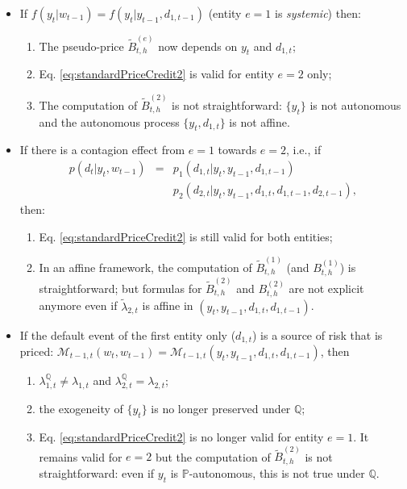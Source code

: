\documentclass[
  12pt,
]{book}
\providecommand{\tightlist}{%
  \setlength{\itemsep}{0pt}\setlength{\parskip}{0pt}}
\theoremstyle{definition}
\theoremstyle{definition}
\theoremstyle{definition}
\theoremstyle{definition}
\theoremstyle{remark}
\begin{document}
\begin{itemize}
\item
  If \(f (y_t | w_{t-1}) = f (y_t | y_{t-1} , d_{1, t-1})\) (entity \(e = 1\) is \emph{systemic}) then:

  \begin{enumerate}
  \def\labelenumi{\alph{enumi}.}
  \tightlist
  \item
    The pseudo-price \(\widetilde{B}^{(e)}_{t,h}\) now depends on \(y_t\) and \(d_{1, t}\);
  \item
    Eq. \eqref{eq:standardPriceCredit2} is valid for entity \(e = 2\) only;
  \item
    The computation of \(\widetilde{B}^{(2)}_{t,h}\) is not straightforward: \(\{ y_t \}\)
    is not autonomous and the autonomous process \(\{ y_t, d_{1,t} \}\) is not affine.
  \end{enumerate}
\item
  If there is a contagion effect from \(e = 1\) towards \(e = 2\), i.e., if
  \begin{eqnarray*}
  p ( d_t  |  y_t, w_{t-1} ) &=& p_1 ( d_{1, t}  |  y_t, y_{t-1}, d_{1, t-1}) \\
  &&  p_2 ( d_{2, t}  |  y_t, y_{t-1}, d_{1, t}, d_{1, t-1}, d_{2, t-1}),
  \end{eqnarray*}
  then:

  \begin{enumerate}
  \def\labelenumi{\alph{enumi}.}
  \tightlist
  \item
    Eq. \eqref{eq:standardPriceCredit2} is still valid for both entities;
  \item
    In an affine framework, the computation of \(\widetilde{B}^{(1)}_{t, h}\) (and \(B^{(1)}_{t,h}\)) is straightforward; but formulas for \(\widetilde{B}^{(2)}_{t,h}\) and \(B^{(2)}_{t,h}\) are not explicit anymore even if \(\widetilde{\lambda}_{2, t}\) is affine in \((y_t, y_{t-1}, d_{1, t}, d_{1, t-1})\).
  \end{enumerate}
\item
  If the default event of the first entity only (\(d_{1,t}\)) is a source of risk that is priced: \(\mathcal{M}_{t-1, t}( w_t, w_{t-1}) = \mathcal{M}_{t-1, t}( y_t, y_{t-1}, d_{1, t}, d_{1, t-1})\), then

  \begin{enumerate}
  \def\labelenumi{\alph{enumi}.}
  \tightlist
  \item
    \(\lambda^{\mathbb{Q}}_{1, t} \neq \lambda_{1, t}\) and \(\lambda^{\mathbb{Q}}_{2, t} = \lambda_{2, t}\);
  \item
    the exogeneity of \(\{ y_t \}\) is no longer preserved under \(\mathbb{Q}\);
  \item
    Eq. \eqref{eq:standardPriceCredit2} is no longer valid for entity \(e = 1\). It remains valid for \(e=2\) but the computation of \(\widetilde{B}^{(2)}_{t,h}\) is not straightforward: even if \(y_t\) is \(\mathbb{P}\)-autonomous, this is not true under \(\mathbb{Q}\).
  \end{enumerate}
\end{itemize}
\end{document}
